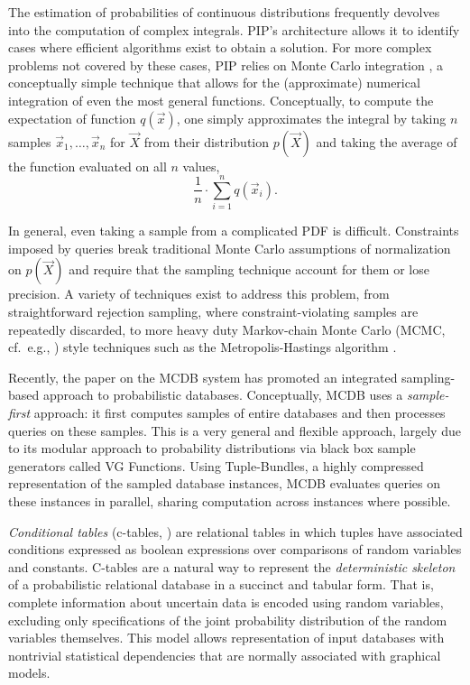 

The estimation of probabilities of continuous distributions frequently devolves into the computation of complex integrals.  PIP's architecture allows it to identify cases where efficient algorithms exist to obtain a solution.  For more complex problems not covered by these cases, PIP relies on Monte Carlo integration \cite{montecarlo}, a conceptually simple technique that allows for the (approximate) numerical integration of even the most general  functions. Conceptually, to compute the expectation of function $q(\vec x)$, one simply approximates the integral by taking $n$ samples $\vec{x}_1, \dots, \vec{x}_n$ for $\vec{X}$ from their distribution $p(\vec X)$  and  taking  the  average of the function evaluated on all $n$ values,
%
\begin{equation}\label{eq:mc_expectation}
\frac{1}{n} \cdot \sum_{i=1}^n q(\vec{x}_i).
\end{equation}

In general, even taking a sample from a complicated PDF is difficult.  Constraints imposed by queries break traditional Monte Carlo assumptions of normalization on $p(\vec X)$ and require that the sampling technique account for them or lose precision.  A variety of techniques exist to address this problem, from straightforward rejection sampling, where constraint-violating samples are repeatedly discarded, to more heavy duty Markov-chain Monte Carlo (MCMC, cf.\ e.g., \cite{GRS1995}) style techniques such as the Metropolis-Hastings algorithm \cite{metropolis,GRS1995}. 

Recently,  the paper  \cite{MCDB} on  the MCDB  system  has promoted an integrated  sampling-based  approach to  probabilistic databases.  Conceptually,  MCDB uses a {\em sample-first}\/ approach: it   first  computes  samples  of  entire databases and then processes queries  on these samples.  This is a very general and flexible approach, largely due to its modular approach to probability distributions via black box sample generators called VG Functions.  Using Tuple-Bundles, a highly compressed representation of the sampled database instances, MCDB evaluates queries on these instances in parallel, sharing computation across instances where possible.  

{\em  Conditional tables}\/  (c-tables, \cite{IL1984})  are relational tables in which tuples have associated conditions expressed as boolean expressions over  comparisons of random variables  and constants. C-tables are a natural way to  represent  the  {\em  deterministic skeleton}\/  of a probabilistic relational  database in  a succinct  and tabular  form.  That  is, complete information  about uncertain data is encoded using random  variables, excluding only  specifications  of the  joint  probability  distribution of  the random  variables   themselves.   This  model   allows  representation of  input databases  with  nontrivial statistical  dependencies that are normally associated with graphical models. 

